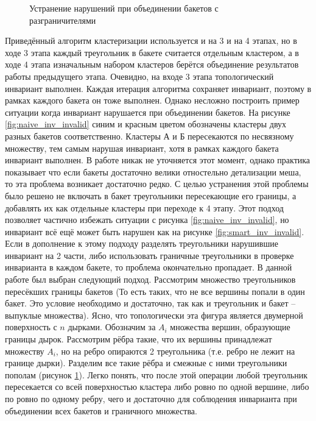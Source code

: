 \documentclass[12pt]{extarticle}
\begin{document}
\begin{figure}[ht]
  \caption{Устранение нарушений при объединении бакетов с разграничителями}
  \label{fig:inv_valid}
\endminipage\hfill
\end{figure}
Приведённый алгоритм кластеризации используется и на 3 и на 4 этапах, но в ходе 3 этапа каждый треугольник в бакете считается отдельным кластером, а в ходе 4 этапа изначальным набором кластеров берётся объединение результатов работы предыдущего этапа. Очевидно, на входе 3 этапа топологический инвариант выполнен. Каждая итерация алгоритма сохраняет инвариант, поэтому в рамках каждого бакета он тоже выполнен. Однако несложно построить пример ситуации когда инвариант нарушается при объединении бакетов. На рисунке  \ref{fig:naive_inv_invalid} синим и красным цветом обозначены кластеры двух разных бакетов соответственно. Кластеры А и Б пересекаются по несвязному множеству, тем самым нарушая инвариант, хотя в рамках каждого бакета инвариант выполнен. В работе \cite{niski2007multi} никак не уточняется этот момент, однако практика показывает что если бакеты достаточно велики отностельно детализации меша, то эта проблема возникает достаточно редко. С целью устранения этой проблемы было решено не включать в бакет треугольники пересекающие его границы, а добавлять их как отдельные кластеры при переходе к 4 этапу. Этот подход позволяет частично избежать ситуации с рисунка \ref{fig:naive_inv_invalid}, но инвариант всё ещё может быть нарушен как на рисунке \ref{fig:smart_inv_invalid}. Если в дополнение к этому подходу разделять треугольники нарушившие инвариант на 2 части, либо использовать граничные треугольники в проверке инварианта в каждом бакете, то проблема окончательно пропадает. В данной работе был выбран следующий подход. Рассмотрим множество треугольников пересёкших границы бакетов (То есть таких, что не все вершины попали в один бакет. Это условие необходимо и достаточно, так как и треугольник и бакет -- выпуклые множества). Ясно, что топологически эта фигура является двумерной поверхность с $n$ дырками. Обозначим за $A_i$ множества вершин, образующие границы дырок. Рассмотрим рёбра такие, что их вершины принадлежат множеству $A_i$, но на ребро опираются 2 треугольника (т.е. ребро не лежит на границе дырки). Разделим все такие рёбра и смежные с ними треугольники пополам (рисунок \ref{fig:inv_valid}). Легко понять, что после этой операции любой треугольник пересекается со всей поверхностью кластера либо ровно по одной вершине, либо по ровно по одному ребру, чего и достаточно для соблюдения инварианта при объединении всех бакетов и граничного множества.
\end{document}
